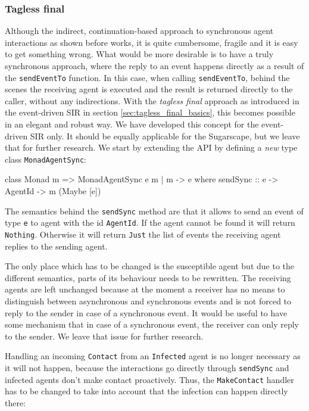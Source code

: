 \subsubsection{Tagless final}
Although the indirect, continuation-based approach to synchronous agent interactions as shown before works, it is quite cumbersome, fragile and it is easy to get something wrong. What would be more desirable is to have a truly synchronous approach, where the reply to an event happens directly as a result of the \texttt{sendEventTo} function. In this case, when calling \texttt{sendEventTo}, behind the scenes the receiving agent is executed and the result is returned directly to the caller, without any indirections. With the \textit{tagless final} approach as introduced in the event-driven SIR in section \ref{sec:tagless_final_basics}, this becomes possible in an elegant and robust way. We have developed this concept for the event-driven SIR only. It should be equally applicable for the Sugarscape, but we leave that for further research. We start by extending the API by defining a \textit{new} type class \texttt{MonadAgentSync}:

\begin{HaskellCode}
class Monad m => MonadAgentSync e m | m -> e where
  sendSync :: e -> AgentId -> m (Maybe [e])
\end{HaskellCode}

The semantics behind the \texttt{sendSync} method are that it allows to send an event of type \texttt{e} to agent with the id \texttt{AgentId}. If the agent cannot be found it will return \texttt{Nothing}. Otherwise it will return \texttt{Just} the list of events the receiving agent replies to the sending agent. 

The only place which has to be changed is the susceptible agent but due to the different semantics, parts of its behaviour needs to be rewritten. The receiving agents are left unchanged because at the moment a receiver has no means to distinguish between asynchronous and synchronous events and is not forced to reply to the sender in case of a synchronous event. It would be useful to have some mechanism that in case of a synchronous event, the receiver can only reply to the sender. We leave that issue for further research.

Handling an incoming \texttt{Contact} from an \texttt{Infected} agent is no longer necessary as it will not happen, because the interactions go directly through \texttt{sendSync} and infected agents don't make contact proactively. Thus, the \texttt{MakeContact} handler has to be changed to take into account that the infection can happen directly there:

